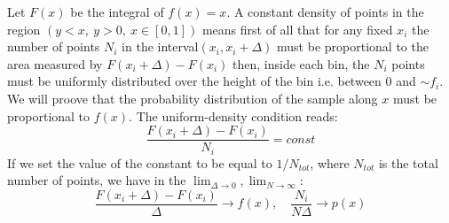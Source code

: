 \documentclass[10pt,a4paper]{report}
\begin{document}
Let $F(x)$ be the integral of $f(x)=x$. 
A constant density of points in the region $(y<x, \ y>0,\ x\in[0,1])$ means first of all that for any fixed $x_{i}$ the number of points $N_{i}$ in the interval$ (x_{i}, x_{i}+\Delta)$ must be proportional to the area measured by $F(x_{i}+\Delta)-F(x_{i})$ then, inside each bin, the $N_{i}$ points must be uniformly distributed over the height of the bin i.e. between 0 and $\sim f_{i}$. \\
We will proove that the probability distribution of the sample along $x$ must be proportional to $f(x)$.
The uniform-density condition reads:
\begin{equation}
\dfrac{F(x_{i}+\Delta)-F(x_{i})}{N_{i}}=const
\end{equation}
If we set the value of the constant to be equal to $1/N_{tot}$, where $N_{tot}$ is the total number of points, we have in the $\lim_{\Delta\to 0}, \lim_{N\to\infty} $:
\begin{equation}
\dfrac{F(x_{i}+\Delta)-F(x_{i})}{\Delta}\rightarrow f(x), \quad \dfrac{N_{i}}{N\Delta}\rightarrow p(x)
\end{equation}
\end{document}
